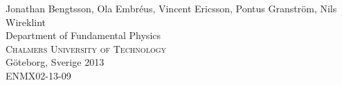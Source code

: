 \documentclass[../main/report.tex]{subfiles}
\begin{document}
\begin{titlepage}
\begin{flushleft}
{    

	{\Large Jonathan Bengtsson, Ola Embréus, Vincent Ericsson, Pontus Granström, Nils Wireklint}\\[1 cm]

	

	{\Large Department of Fundamental Physics \\

	\textsc{Chalmers University of Technology} \\

	Göteborg, Sverige 2013 \\

    ENMX02-13-09\\

	} 

	}

\end{flushleft}



\end{titlepage}



\ClearShipoutPicture



\newpage 
\end{document}
